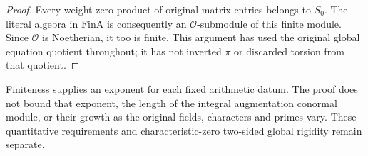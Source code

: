 \begin{proof}
Every weight-zero product of original matrix entries belongs to
$S_0$.  The literal algebra in $\mathrm{FinA}$ is consequently an
$\mathcal O$-submodule of this finite module.  Since $\mathcal O$
is Noetherian, it too is finite.  This argument has used the original
global equation quotient throughout; it has not inverted $\pi$ or
discarded torsion from that quotient.
\end{proof}

Finiteness supplies an exponent for each fixed arithmetic datum.  The
proof does not bound that exponent, the length of the integral
augmentation conormal module, or their growth as the original fields,
characters and primes vary.  These quantitative requirements and
characteristic-zero two-sided global rigidity remain separate.
